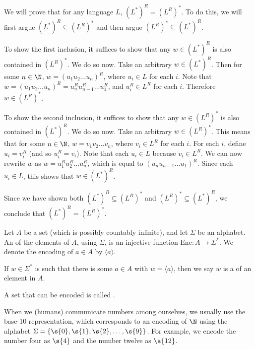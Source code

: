 \begin{solution}
We will prove that for any language $L$, $(L^*)^R = (L^R)^*$. To do this, we will first argue $(L^*)^R \subseteq (L^R)^*$ and then argue $(L^R)^* \subseteq (L^*)^R$.

To show the first inclusion, it suffices to show that any $w \in (L^*)^R$ is also contained in $(L^R)^*$. We do so now. Take an arbitrary $w \in (L^*)^R$. Then for some $n \in \N$, $w = (u_1u_2\ldots u_n)^R$, where $u_i \in L$ for each $i$. Note that $w = (u_1u_2\ldots u_n)^R = u_n^R u_{n-1}^R \ldots u_1^R$, and $u_i^R \in L^R$ for each $i$. Therefore $w \in (L^R)^*$.

To show the second inclusion, it suffices to show that any $w \in (L^R)^*$ is also contained in $(L^*)^R$. We do so now. Take an arbitrary $w \in (L^R)^*$. This means that for some $n \in \N$, $w = v_1 v_2 \ldots v_n$, where $v_i \in L^R$ for each $i$. For each $i$, define $u_i = v_i^R$ (and so $u_i^R = v_i$). Note that each $u_i \in L$ because $v_i \in L^R$. We can now rewrite $w$ as $w = u_1^R u_2^R \ldots u_n^R$, which is equal to $(u_n u_{n-1} \ldots u_1)^R$. Since each $u_i \in L$, this shows that $w \in (L^*)^R$.

Since we have shown both $(L^*)^R \subseteq (L^R)^*$ and $(L^R)^* \subseteq (L^*)^R$, we conclude that $(L^*)^R = (L^R)^*$.
\end{solution}

\begin{definition} \label{definition:Encoding-of-a-set}
Let $A$ be a set (which is possibly countably infinite), and let $\Sigma$ be an alphabet. 
An  of the elements of $A$, using $\Sigma$, is an injective function $\text{Enc}: A \to \Sigma^*$. 
We denote the encoding of $a \in A$ by $\langle a \rangle$. 

If $w \in \Sigma^*$ is such that there is some $a \in A$ with $w = \langle a \rangle$, then we say $w$ is a  of an element in $A$. 

A set that can be encoded is called .
\end{definition}

\begin{example} \label{example:Decimal-encoding-of-naturals}
When we (humans) communicate numbers among ourselves, we usually use the base-10 representation, which corresponds to an encoding of $\N$ using the alphabet $\Sigma = \{\s{0},\s{1},\s{2},\ldots, \s{9}\}$. For example, we encode the number four as $\s{4}$ and the number twelve as $\s{12}$.
\end{example}

